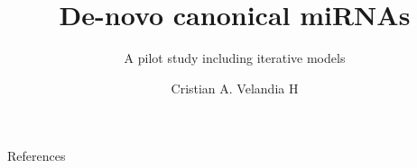 \documentclass[aspectratio=169]{beamer}
\title{De-novo canonical miRNAs}
\subtitle{A pilot study including iterative models}
\author{Cristian A. Velandia H}
\institute{TBI \\ University of Vienna}
\date{}
\begin{document}
\begin{frame}
    \maketitle
\end{frame}

%
%
%
%
%
%
%
%




\begin{frame}{References}
    \printbibliography
\end{frame}
\end{document}
